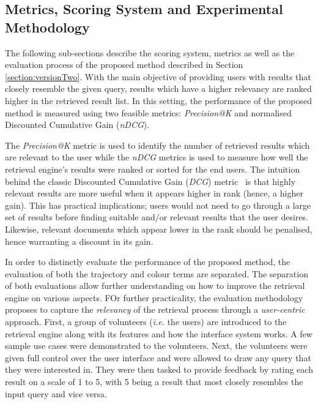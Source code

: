 \vspace{1em}
\subsection{Metrics, Scoring System and Experimental Methodology}
\label{sec:retrieval-metrics}
The following sub-sections describe the scoring system, metrics as well as the evaluation process of the proposed method described in Section \ref{section:versionTwo}. With the main objective of providing users with results that closely resemble the given query, results which have a higher relevancy are ranked higher in the retrieved result list. In this setting, the performance of the proposed method is measured using two feasible metrics: \textit{Precision@K} and normalised Discounted Cumulative Gain (\textit{nDCG}).

The \textit{Precision@K} metric is used to identify the number of retrieved results which are relevant to the user while the \textit{nDCG} metrics is used to measure how well the retrieval engine's results were ranked or sorted for the end
users. The intuition behind the classic Discounted Cumulative Gain (\textit{DCG}) metric~\cite{jarvelin2002cumulated} is that highly relevant results are more useful when it appears higher in rank (hence, a higher gain). This has practical implications; users would not need to go through a large set of results before finding suitable and/or relevant results that the user desires. Likewise, relevant documents which appear lower in the rank should be penalised, hence warranting a discount in its gain.

In order to distinctly evaluate the performance of the proposed method, the evaluation of both the trajectory and colour terms are separated. The separation of both evaluations allow further understanding on how to improve the retrieval engine on various aspects. FOr further practicality, the evaluation methodology proposes to capture the \emph{relevancy} of the retrieval process through a \emph{user-centric} approach. First, a group of volunteers (\emph{i.e.} the users) are introduced to the retrieval engine along with its features and how the interface system works. A few sample use cases were demonstrated to the volunteers. Next, the volunteers were given full control over the user interface and were allowed to draw any query that they were interested in. They were then tasked to provide feedback by rating each result on a scale of 1 to 5, with 5 being a result that most closely resembles the input query and vice versa.

